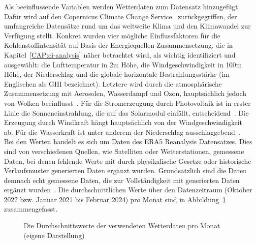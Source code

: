 Als beeinflussende Variablen werden Wetterdaten zum Datensatz hinzugefügt.
Dafür wird auf den Copernicus Climate Change Service~\cite{Copernicus.20231212T14:09:40.000Z} zurückgegriffen, der umfangreiche Datensätze rund um das weltweite Klima und den Klimawandel zur Verfügung stellt.
Konkret wurden vier mögliche Einflussfaktoren für die Kohlenstoffintensität auf Basis der Energiequellen-Zusammensetzung, die in Kapitel~\ref{CAP:ci-analysis} näher betrachtet wird, als wichtig identifiziert und ausgewählt:
die Lufttemperatur in 2m Höhe, die Windgeschwindigkeit in 100m Höhe, der Niederschlag und die globale horizontale Bestrahlungsstärke (im Englischen als \ac{GHI} bezeichnet).
Letztere wird durch die atmosphärische Zusammensetzung mit Aerosolen, Wasserdampf und Ozon, hauptsächlich jedoch von Wolken beeinflusst~\cite{KallioMyers.2020}.
Für die Stromerzeugung durch Photovoltaik ist in erster Linie die Sonneneinstrahlung, die auf das Solarmodul einfällt, entscheidend~\cite{James.}.
Die Erzeugung durch Windkraft hängt hauptsächlich von der Windgeschwindigkeit ab.
Für die Wasserkraft ist unter anderem der Niederschlag ausschlaggebend~\cite{Copernicus.20231212T14:09:40.000Z}.
Bei den Werten handelt es sich um Daten des ERA5 Reanalysis Datensatzes.
Dies sind von verschiedenen Quellen, wie Satelliten oder Wetterstationen, gemessene Daten, bei denen fehlende Werte mit durch physikalische Gesetze oder historische Verlaufsmuster generierten Daten ergänzt wurden.
Grundsätzlich sind die Daten demnach echt gemessene Daten, die zur Vollständigkeit mit generierten Daten ergänzt wurden~\cite{CopernicusClimateChangeService.2020}\cite{CopernicusKnowledgeBase.20231009}.
Die durchschnittlichen Werte über den Datenzeitraum (Oktober 2022 bzw. Januar 2021 bis Februar 2024) pro Monat sind in Abbildung~\ref{FIG:weather-data-by-month} zusammengefasst.
\begin{figure}[ht]
 \centering
 \par\medskip
 \caption[Durchschnittswerte der Wetterdaten]{Die Durchschnittswerte der verwendeten Wetterdaten pro Monat (eigene Darstellung)}%
 \label{FIG:weather-data-by-month}%
\end{figure}
